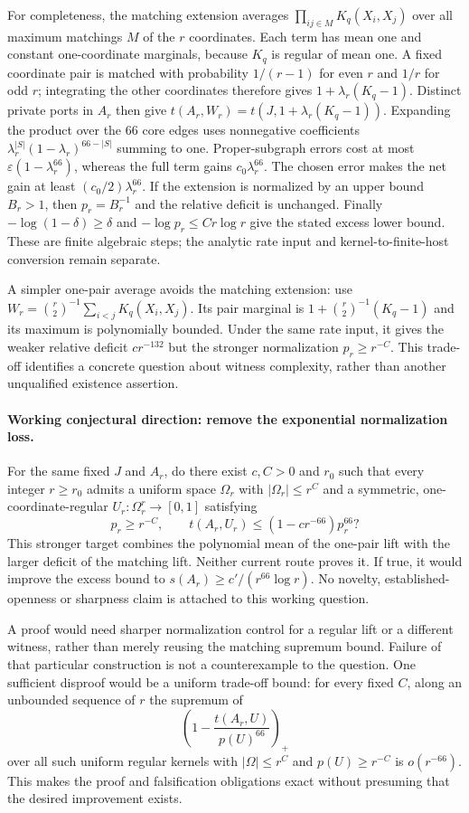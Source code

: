 For completeness, the matching extension averages
$\prod_{ij\in M}K_q(X_i,X_j)$ over all maximum matchings $M$ of the $r$
coordinates. Each term has mean one and constant one-coordinate marginals,
because $K_q$ is regular of mean one. A fixed coordinate pair is matched
with probability $1/(r-1)$ for even $r$ and $1/r$ for odd $r$; integrating
the other coordinates therefore gives $1+\lambda_r(K_q-1)$. Distinct
private ports in $A_r$ then give $t(A_r,W_r)=t(J,1+\lambda_r(K_q-1))$.
Expanding the product over the $66$ core edges uses nonnegative coefficients
$\lambda_r^{|S|}(1-\lambda_r)^{66-|S|}$ summing to one. Proper-subgraph
errors cost at most $\varepsilon(1-\lambda_r^{66})$, whereas the full term
gains $c_0\lambda_r^{66}$. The chosen error makes the net gain at least
$(c_0/2)\lambda_r^{66}$. If the extension is normalized by an upper bound
$B_r>1$, then $p_r=B_r^{-1}$ and the relative deficit is unchanged.
Finally $-\log(1-\delta)\ge\delta$ and $-\log p_r\le Cr\log r$ give the
stated excess lower bound. These are finite algebraic steps; the analytic
rate input and kernel-to-finite-host conversion remain separate.

A simpler one-pair average avoids the matching extension: use
$W_r=\binom r2^{-1}\sum_{i<j}K_q(X_i,X_j)$. Its pair marginal is
$1+\binom r2^{-1}(K_q-1)$ and its maximum is polynomially bounded.
Under the same rate input, it gives the weaker relative deficit
$c r^{-132}$ but the stronger normalization $p_r\ge r^{-C}$.
This trade-off identifies a concrete question about witness complexity,
rather than another unqualified existence assertion.

\paragraph{Working conjectural direction: remove the exponential normalization loss.}
For the same fixed $J$ and $A_r$, do there exist $c,C>0$ and $r_0$ such
that every integer $r\ge r_0$ admits a uniform space $\Omega_r$ with
$|\Omega_r|\le r^C$ and a symmetric, one-coordinate-regular
$U_r:\Omega_r^r\to[0,1]$ satisfying
\[
 p_r\ge r^{-C},\qquad
 t(A_r,U_r)\le(1-c r^{-66})p_r^{66}?
\]
This stronger target combines the polynomial mean of the one-pair lift
with the larger deficit of the matching lift. Neither current route proves
it. If true, it would improve the excess bound to
$s(A_r)\ge c'/(r^{66}\log r)$. No novelty, established-openness or sharpness
claim is attached to this working question.

A proof would need sharper normalization control for a regular lift or a
different witness, rather than merely reusing the matching supremum bound.
Failure of that particular construction is not a counterexample to the
question. One sufficient disproof would be a uniform trade-off bound: for
every fixed $C$, along an unbounded sequence of $r$ the supremum of
\[
 \left(1-\frac{t(A_r,U)}{p(U)^{66}}\right)_+
\]
over all such uniform regular kernels with $|\Omega|\le r^C$ and
$p(U)\ge r^{-C}$ is $o(r^{-66})$. This makes the proof and falsification
obligations exact without presuming that the desired improvement exists.

